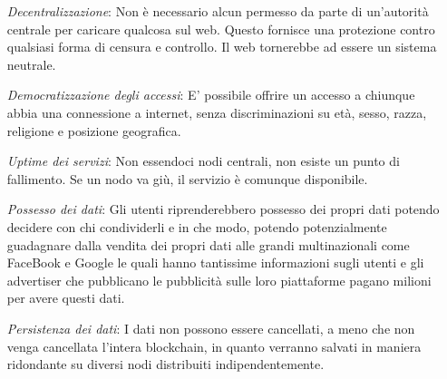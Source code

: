 \begin{itemize}
    \item [\textit{Decentralizzazione}:] Non è necessario alcun permesso da parte di un'autorità centrale per caricare qualcosa sul web. Questo fornisce una protezione contro qualsiasi forma di censura e controllo. Il web tornerebbe ad essere un sistema neutrale.
    \item [\textit{Democratizzazione degli accessi}:] E' possibile offrire un accesso a chiunque abbia una connessione a internet, senza discriminazioni su età, sesso, razza, religione e posizione geografica.
    \item [\textit{Uptime dei servizi}:] Non essendoci nodi centrali, non esiste un punto di fallimento. Se un nodo va giù, il servizio è comunque disponibile.
    \item [\textit{Possesso dei dati}:] Gli utenti riprenderebbero possesso dei propri dati potendo decidere con chi condividerli e in che modo, potendo potenzialmente guadagnare dalla vendita dei propri dati alle grandi multinazionali come FaceBook e Google le quali hanno tantissime informazioni sugli utenti e gli advertiser che pubblicano le pubblicità sulle loro piattaforme pagano milioni per avere questi dati.
    \item [\textit{Persistenza dei dati}:] I dati non possono essere cancellati, a meno che non venga cancellata l'intera blockchain, in quanto verranno salvati in maniera ridondante su diversi nodi distribuiti indipendentemente.
\end{itemize}